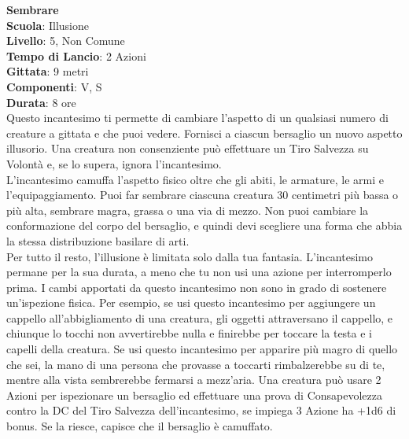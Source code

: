 \begin{multicols}{2}
\medskip\textbf{Sembrare}\\
\textbf{Scuola}: Illusione\\
\textbf{Livello}: 5, Non Comune\\
\textbf{Tempo di Lancio}: 2 Azioni\\
\textbf{Gittata}: 9 metri\\
\textbf{Componenti}: V, S\\
\textbf{Durata}: 8 ore\\
Questo incantesimo ti permette di cambiare l'aspetto di un qualsiasi numero di creature a gittata e che puoi vedere. Fornisci a ciascun bersaglio un nuovo aspetto illusorio. Una creatura non consenziente può effettuare un Tiro Salvezza su Volontà e, se lo supera, ignora l'incantesimo.\\
L'incantesimo camuffa l'aspetto fisico oltre che gli abiti, le armature, le armi e l'equipaggiamento. Puoi far sembrare ciascuna creatura 30 centimetri più bassa o più alta, sembrare magra, grassa o una via di mezzo. Non puoi cambiare la conformazione del corpo del bersaglio, e quindi devi scegliere una forma che abbia la stessa distribuzione basilare di arti. \\
Per tutto il resto, l'illusione è limitata solo dalla tua fantasia. L'incantesimo permane per la sua durata, a meno che tu non usi una azione per interromperlo prima. I cambi apportati da questo incantesimo non sono in grado di sostenere un'ispezione fisica. Per esempio, se usi questo incantesimo per aggiungere un cappello all'abbigliamento di una creatura, gli oggetti attraversano il cappello, e chiunque lo tocchi non avvertirebbe nulla e finirebbe per toccare la testa e i capelli della creatura.
Se usi questo incantesimo per apparire più magro di quello che sei, la mano di una persona che provasse a toccarti rimbalzerebbe su di te, mentre alla vista sembrerebbe fermarsi a mezz'aria. Una creatura può usare 2 Azioni per ispezionare un bersaglio ed effettuare una prova di Consapevolezza contro la DC del Tiro Salvezza dell'incantesimo, se impiega 3 Azione ha +1d6 di bonus. Se la riesce, capisce che il bersaglio è camuffato.


\end{multicols}
